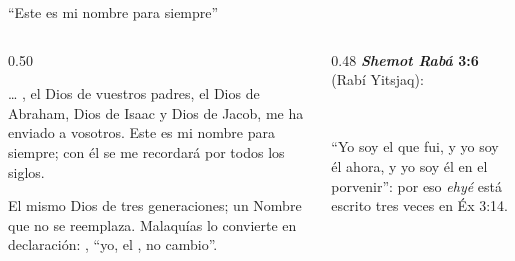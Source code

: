 \begin{frame}{``Este es mi nombre para siempre''}
\begin{columns}[t,onlytextwidth]
\begin{column}{0.50\textwidth}
\begin{cita}\ldots{} \SENOR, el Dios de vuestros padres, el Dios de Abraham, Dios de Isaac y Dios de Jacob, me ha enviado a vosotros. Este es mi nombre para siempre; con él se me recordará por todos los siglos.\end{cita}
\begin{center}\end{center}
\small El mismo Dios de tres generaciones; un Nombre que no se reemplaza. Malaquías lo convierte en declaración: , ``yo, el \SENOR, no cambio''.
\end{column}
\begin{column}{0.48\textwidth}\small
\textbf{\emph{Shemot Rabá} 3:6} (Rabí Yitsjaq):
\begin{center}\\ \end{center}
``Yo soy el que fui, y yo soy él ahora, y yo soy él en el porvenir'': por eso \emph{ehyé} está escrito tres veces en Éx 3:14.\par\smallskip
{}
\end{column}
\end{columns}
\end{frame}

